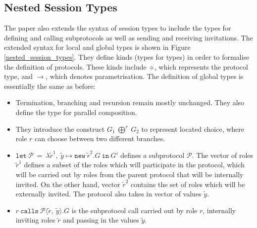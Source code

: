 \documentclass[12pt,twoside]{report}
\begin{document}
\subsection{Nested Session Types}\label{nested-session-types}
The paper also extends the syntax of session types to include the types for defining and calling subprotocols as well as sending and receiving invitations. The extended syntax for local and global types is shown in Figure \ref{nested_session_types}. They define kinds (types for types) in order to formalise the definition of protocols. These kinds include $\diamond$, which represents the protocol type, and $\longrightarrow$, which denotes parametrisation. The definition of global types is essentially the same as before:
\begin{itemize}
    \item Termination, branching and recursion remain mostly unchanged. They also define the type for parallel composition.
    \item They introduce the construct $G_1\ \bigoplus^r\ G_2$ to represent located choice, where role $r$ can choose between two different branches. 
    \item $\texttt{let}\ \mathcal{P}\ =\ \lambda\widetilde{r}^1,\ \widetilde{y} \mapsto \texttt{new}\ \widetilde{r}^2.G\ \texttt{in}\ G'$ defines a subprotocol $\mathcal{P}$. The vector of roles $\widetilde{r}^1$ defines a subset of the roles which will participate in the protocol, which will be carried out by roles from the parent protocol that will be internally invited. On the other hand, vector $\widetilde{r}^2$ contains the set of roles which will be externally invited. The protocol also takes in vector of values $\widetilde{y}$.
    \item $r\ \texttt{calls}\ \mathcal{P}\langle \widetilde{r},\ \widetilde{y}\rangle.G$ is the subprotocol call carried out by role $r$, internally inviting roles $\widetilde{r}$ and passing in the values $\widetilde{y}$.
\end{itemize}{}
\end{document}
